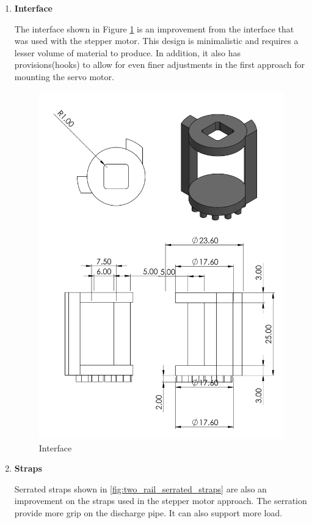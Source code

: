 \begin{enumerate}
\begin{enumerate}
    \item \textbf{Interface}
    \par
    The interface shown in Figure \ref{fig:interface2} is an improvement from the interface that was used with the stepper motor. This design is minimalistic and requires a lesser volume of material to produce. In addition, it also has provisions(hooks) to allow for even finer adjustments in the first approach for mounting the servo motor.
    \begin{figure}[H]
        \centering
        \includegraphics[height=.5\textheight]{Figures/Interface2.PNG}
        \caption{Interface}
        \label{fig:interface2}
    \end{figure}
    \par
    \item \textbf{Straps}
    \par
    Serrated straps shown in \ref{fig:two_rail_serrated_straps} are also an improvement on the straps used in the stepper motor approach. The serration provide more grip on the discharge pipe. It can also support more load. 

\end{enumerate}
\end{enumerate}

